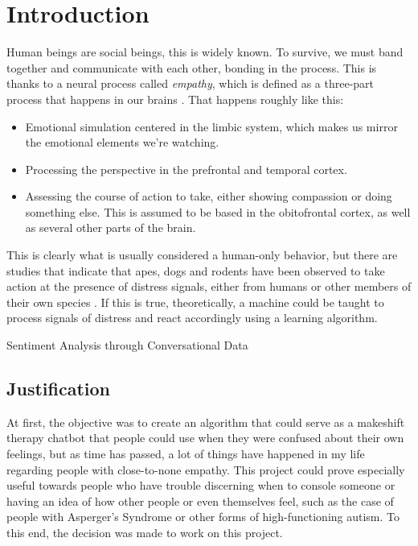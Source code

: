 \chapter{Introduction}
\label{ch1}
Human beings are social beings, this is widely known. To survive, we must band together and communicate with each other, bonding in the process. This is thanks to a neural process called \textit{empathy}, which is defined as a three-part process that happens in our brains \citep{rf1}. That happens roughly like this:
\begin{itemize}
	\item Emotional simulation centered in the limbic system, which makes us mirror the emotional elements we're watching.
	\item Processing the perspective in the prefrontal and temporal cortex.
	\item Assessing the course of action to take, either showing compassion or doing something else. This is assumed to be based in the obitofrontal cortex, as well as several other parts of the brain.
\end{itemize}
This is clearly what is usually considered a human-only behavior, but there are studies that indicate that apes, dogs and rodents have been observed to take action at the presence of distress signals, either from humans or other members of their own species \citep{rf2}.
If this is true, theoretically, a machine could be taught to process signals of distress and react accordingly using a learning algorithm.
\pagebreak


\begin{center}
{\Huge Sentiment Analysis through Conversational Data}
\end{center}

\section{Justification}
At first, the objective was to create an algorithm that could serve as a makeshift therapy chatbot that people could use when they were confused about their own feelings, but as time has passed, a lot of things have happened in my life regarding people with close-to-none empathy.
This project could prove especially useful towards people who have trouble discerning when to console someone or having an idea of how other people or even themselves feel, such as the case of people with Asperger's Syndrome or other forms of high-functioning autism.
To this end, the decision was made to work on this project.

